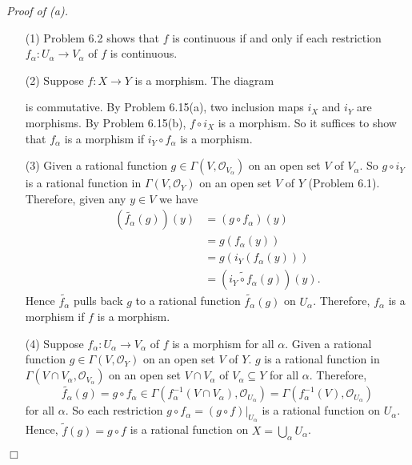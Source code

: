 \documentclass{article}
\begin{document}
\emph{Proof of (a).}
\begin{enumerate}
\item[(1)]
  Problem 6.2 shows that
  $f$ is continuous if and only if
  each restriction $f_\alpha: U_\alpha \to V_\alpha$ of $f$ is continuous.

\item[(2)]
  Suppose $f: X \to Y$ is a morphism.
  The diagram
  \begin{center}
  \end{center}
  is commutative.
  By Problem 6.15(a), two inclusion maps $i_X$ and $i_Y$ are morphisms.
  By Problem 6.15(b), $f \circ i_X$ is a morphism.
  So it suffices to show that $f_\alpha$ is a morphism if
  $i_Y \circ f_\alpha$ is a morphism.

\item[(3)]
  Given a rational function $g \in \Gamma(V, \mathscr{O}_{V_\alpha})$
  on an open set $V$ of $V_\alpha$.
  So $g \circ i_Y$ is a rational function in $\Gamma(V, \mathscr{O}_{Y})$
  on an open set $V$ of $Y$ (Problem 6.1).
  Therefore, given any $y \in V$ we have
  \begin{align*}
    (\widetilde{f_\alpha}(g))(y)
    &= (g \circ f_\alpha)(y) \\
    &= g(f_\alpha(y)) \\
    &= g(i_Y(f_\alpha(y))) \\
    &= (\widetilde{i_Y \circ f_\alpha}(g))(y).
  \end{align*}
  Hence $\widetilde{f_\alpha}$ pulls back $g$ to a rational function
  $\widetilde{f_\alpha}(g)$ on $U_\alpha$.
  Therefore, $f_\alpha$ is a morphism if $f$ is a morphism.

\item[(4)]
  Suppose $f_\alpha: U_\alpha \to V_\alpha$ of $f$ is a morphism for all $\alpha$.
  Given a rational function $g \in \Gamma(V, \mathscr{O}_Y)$ on an open set $V$ of $Y$.
  $g$ is a rational function in $\Gamma(V \cap V_\alpha, \mathscr{O}_{V_\alpha})$
  on an open set $V \cap V_\alpha$ of $V_\alpha \subseteq Y$ for all $\alpha$.
  Therefore,
  \[
    \widetilde{f_\alpha}(g)
    = g \circ f_\alpha
    \in \Gamma(f_\alpha^{-1}(V \cap V_\alpha), \mathscr{O}_{U_\alpha})
    = \Gamma(f_\alpha^{-1}(V), \mathscr{O}_{U_\alpha})
  \]
  for all $\alpha$.
  So each restriction $g \circ f_\alpha = (g \circ f)|_{U_\alpha}$
  is a rational function on $U_\alpha$.
  Hence, $\widetilde{f}(g) = g \circ f$ is a rational function on
  $X = \bigcup_{\alpha} U_\alpha$.
\end{enumerate}
$\Box$ \\
\end{document}
